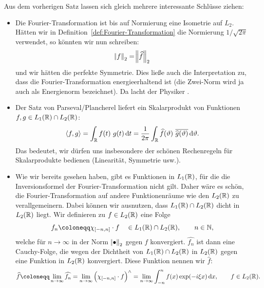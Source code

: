\begin{remark}
Aus dem vorherigen Satz lassen sich gleich mehrere interessante Schlüsse ziehen:
\begin{itemize}
\item Die Fourier-Transformation ist bis auf Normierung eine Isometrie auf $ L_{2} $. Hätten wir in 
  Definition~\ref{def:Fourier-Transformation} die Normierung $ 1 / \sqrt{2\pi} $ verwendet, so
  könnten wir nun schreiben:
  \[
    \norm{f}_{2} = \norm{\widehat{f}}_{2}
  \]
  und wir hätten die perfekte Symmetrie. Dies ließe auch die Interpretation zu, dass die 
  Fourier-Transformation energieerhaltend ist (die Zwei-Norm wird ja auch als Energienorm 
  bezeichnet). Da lacht der Physiker \smiley.
\item Der Satz von Parseval/Plancherel liefert ein Skalarprodukt von Funktionen
  $ f, g \in L_{1}(\mathbb{R}) \cap L_{2}(\mathbb{R}) $:
  \[
      \langle f, g \rangle 
    = \int_{\R} f(t) \ g(t) \dif t
    = \frac{1}{2\pi} \int_{\R} \widehat{f}(\vartheta) \ \overline{\widehat{g}(\vartheta)}
          \dif \vartheta.
  \]
  Das bedeutet, wir dürfen uns insbesondere der schönen Rechenregeln für Skalarprodukte bedienen
  (Linearität, Symmetrie usw.).
\item Wie wir bereits gesehen haben, gibt es Funktionen in $ L_{1}(\mathbb{R}) $, für die die 
  Inversionsformel der Fourier-Transformation nicht gilt. Daher wäre es schön, die
  Fourier-Transformation auf andere Funktionenräume wie den $ L_{2}(\mathbb{R}) $ zu verallgemeinern. Dabei
  können wir ausnutzen, dass $ L_{1}(\mathbb{R}) \cap L_{2}(\mathbb{R}) $ dicht in $ L_{2}(\mathbb{R}) $ liegt. Wir
  definieren zu $ f \in L_{2}(\mathbb{R}) $ eine Folge
  \[
    f_{n} \coloneqq \chi_{[-n,n]} \cdot f \quad \in L_{1}(\R) \cap L_{2}(\R), \qquad n \in \N,
  \]
  welche für $ n \to \infty $ in der Norm $ \norm{\bullet}_{2} $ gegen $ f $ konvergiert.
  $ \widehat{f_{n}} $ ist dann eine Cauchy-Folge, die wegen der Dichtheit von $ L_{1}(\mathbb{R}) \cap 
  L_{2}(\mathbb{R}) $ in $ L_{2}(\mathbb{R}) $ gegen eine Funktion in $ L_{2}(\mathbb{R}) $ konvergiert. Diese Funktion 
  nennen wir $ \widehat{f} $:
  \[
      \widehat{f} \coloneqq \lim\limits_{n \to \infty} \widehat{f_{n}}
    = \lim\limits_{n \to \infty} \left( \chi_{[-n,n]} \cdot f \right)^{\wedge}
    = \lim\limits_{n \to \infty} \int_{-n}^{n} f(x) \exp(-i\xi x) \dif x,
      \qquad f \in L_{2}(\R).
  \]
  
\end{itemize}
\end{remark}


